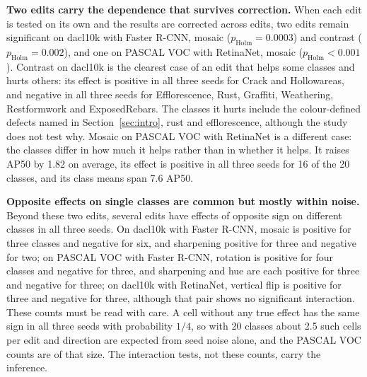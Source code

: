 \documentclass[conference]{IEEEtran}
\begin{document}
\noindent\textbf{Two edits carry the dependence that survives correction.} When each edit is tested on its own and the results are corrected across edits, two edits remain significant on dacl10k with Faster R-CNN, mosaic ($p_{\mathrm{Holm}}=0.0003$) and contrast ($p_{\mathrm{Holm}}=0.002$), and one on PASCAL VOC with RetinaNet, mosaic ($p_{\mathrm{Holm}}<0.001$). Contrast on dacl10k is the clearest case of an edit that helps some classes and hurts others: its effect is positive in all three seeds for Crack and Hollowareas, and negative in all three seeds for Efflorescence, Rust, Graffiti, Weathering, Restformwork and ExposedRebars. The classes it hurts include the colour-defined defects named in Section~\ref{sec:intro}, rust and efflorescence, although the study does not test why. Mosaic on PASCAL VOC with RetinaNet is a different case: the classes differ in how much it helps rather than in whether it helps. It raises AP50 by 1.82 on average, its effect is positive in all three seeds for 16 of the 20 classes, and its class means span 7.6 AP50.

\noindent\textbf{Opposite effects on single classes are common but mostly within noise.} Beyond these two edits, several edits have effects of opposite sign on different classes in all three seeds. On dacl10k with Faster R-CNN, mosaic is positive for three classes and negative for six, and sharpening positive for three and negative for two; on PASCAL VOC with Faster R-CNN, rotation is positive for four classes and negative for three, and sharpening and hue are each positive for three and negative for three; on dacl10k with RetinaNet, vertical flip is positive for three and negative for three, although that pair shows no significant interaction. These counts must be read with care. A cell without any true effect has the same sign in all three seeds with probability $1/4$, so with 20 classes about 2.5 such cells per edit and direction are expected from seed noise alone, and the PASCAL VOC counts are of that size. The interaction tests, not these counts, carry the inference.
\end{document}
